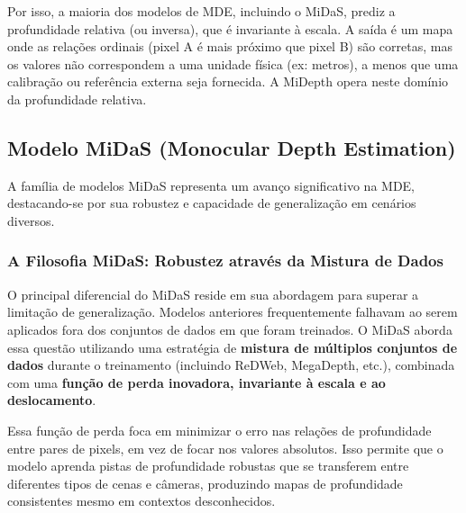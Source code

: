 \documentclass{SBCbookchapter}
\newcommand{\nomeProjeto}{MiDepth }
\begin{document}
    Por isso, a maioria dos modelos de MDE, incluindo o MiDaS, prediz a profundidade relativa (ou inversa), que é invariante à escala. A saída é um mapa onde as relações ordinais (pixel A é mais próximo que pixel B) são corretas, mas os valores não correspondem a uma unidade física (ex: metros), a menos que uma calibração ou referência externa seja fornecida. A \nomeProjeto opera neste domínio da profundidade relativa.
    
    \subsection{Modelo MiDaS (Monocular Depth Estimation)}
    A família de modelos MiDaS \cite{ranftl2022} representa um avanço significativo na MDE, destacando-se por sua robustez e capacidade de generalização em cenários diversos.

    \subsubsection{A Filosofia MiDaS: Robustez através da Mistura de Dados}
    O principal diferencial do MiDaS reside em sua abordagem para superar a limitação de generalização. Modelos anteriores frequentemente falhavam ao serem aplicados fora dos conjuntos de dados em que foram treinados. O MiDaS aborda essa questão utilizando uma estratégia de \textbf{mistura de múltiplos conjuntos de dados} durante o treinamento (incluindo ReDWeb, MegaDepth, etc.), combinada com uma \textbf{função de perda inovadora, invariante à escala e ao deslocamento}.

    Essa função de perda foca em minimizar o erro nas relações de profundidade entre pares de pixels, em vez de focar nos valores absolutos. Isso permite que o modelo aprenda pistas de profundidade robustas que se transferem entre diferentes tipos de cenas e câmeras, produzindo mapas de profundidade consistentes mesmo em contextos desconhecidos.
\end{document}
